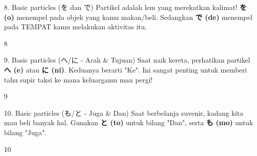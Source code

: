 \begin{lessonbox}{8. Basic particles (を dan で)}
    Partikel adalah lem yang merekatkan kalimat! \textbf{を (o)} menempel pada objek yang kamu makan/beli. Sedangkan \textbf{で (de)} menempel pada TEMPAT kamu melakukan aktivitas itu.
\end{lessonbox}
\begin{convobox}{8}
    \noindent
      

    \vspace{1.5em}
\end{convobox}

\begin{lessonbox}{9. Basic particles (へ/に - Arah \& Tujuan)}
    Saat naik kereta, perhatikan partikel \textbf{へ (e)} atau \textbf{に (ni)}. Keduanya berarti "Ke". Ini sangat penting untuk memberi tahu supir taksi ke mana keluargamu mau pergi!
\end{lessonbox}
\begin{convobox}{9}
    \noindent
      

    \vspace{1.5em}
\end{convobox}

\begin{lessonbox}{10. Basic particles (も/と - Juga \& Dan)}
    Saat berbelanja suvenir, kadang kita mau beli banyak hal. Gunakan \textbf{と (to)} untuk bilang "Dan", serta \textbf{も (mo)} untuk bilang "Juga".
\end{lessonbox}
\begin{convobox}{10}
    \noindent
      
      

    \vspace{1.5em}
\end{convobox}

